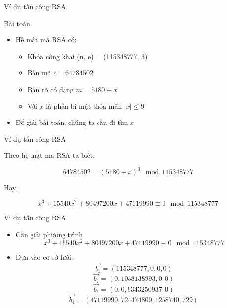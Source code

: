 \begin{frame}{Ví dụ tấn công RSA}

\begin{block}{Bài toán}
\begin{itemize}
\item Hệ mật mã RSA có:

\begin{itemize}
\item Khóa công khai (n, e) = (115348777, 3)
\item Bản mã $c = 64784502$
\item Bản rõ có dạng $m = 5180 + x$
\item Với $x$ là phần bí mật thỏa mãn $|x| \leq 9$
\end{itemize}
\item Để giải bài toán, chúng ta cần đi tìm $x$
\end{itemize}

\end{block}
\end{frame}
\begin{frame}{Ví dụ tấn công RSA}

Theo hệ mật mã RSA ta biết:

\[
64784502 = (5180 + x)^3 \mod 115348777
\]

Hay:

\[
x^3 + 15540x^2 + 80497200x + 47119990 \equiv 0 \mod 115348777
\]

\end{frame}
\begin{frame}{Ví dụ tấn công RSA}

\begin{itemize}
\item Cần giải phương trình
\[
x^3 + 15540x^2 + 80497200x + 47119990 \equiv 0 \mod 115348777
\]
\item Dựa vào cơ sở lưới:
\[
\vec{b_1} = (115348777, 0, 0, 0)
\]
\[
\vec{b_2} = (0, 1038138993, 0, 0)
\]
\[
\vec{b_3} = (0, 0, 9343250937, 0)
\]
\[
\vec{b_4} = (47119990, 724474800, 1258740, 729)
\]
\end{itemize}

\end{frame}
